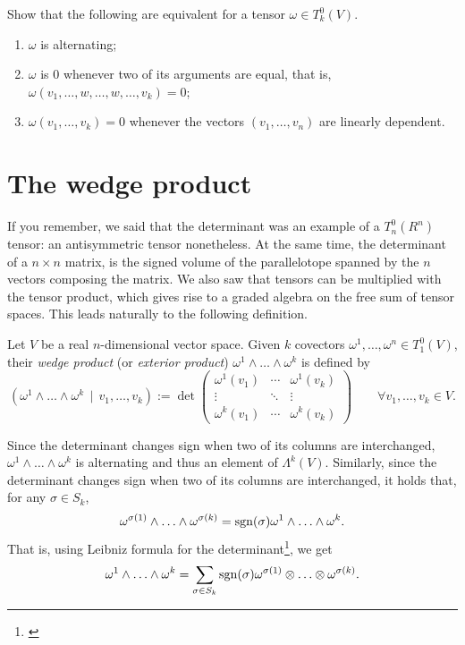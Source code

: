 \begin{exercise}\label{ex:propAlt}
  Show that the following are equivalent for a tensor $\omega\in T_k^0(V)$.
  \begin{enumerate}
    \item $\omega$ is alternating;
    \item $\omega$ is $0$ whenever two of its arguments are equal, that is, ${\omega(v_1, \ldots, w, \ldots, w, \ldots, v_k) = 0}$;
    \item $\omega(v_1, \ldots, v_k) = 0$ whenever the vectors $(v_1, \ldots, v_n)$ are linearly dependent.
  \end{enumerate}
\end{exercise}

\section{The wedge product}

If you remember, we said that the determinant was an example of a $T_n^0(R^n)$ tensor: an antisymmetric tensor nonetheless.
At the same time, the determinant of a $n\times n$ matrix, is the signed volume of the parallelotope spanned by the $n$ vectors composing the matrix.
We also saw that tensors can be multiplied with the tensor product, which gives rise to a graded algebra on the free sum of tensor spaces.
This leads naturally to the following definition.

\begin{definition}
  Let $V$ be a real $n$-dimensional vector space.
  Given $k$ covectors $\omega^1, \ldots, \omega^n\in T_1^0(V)$, their \emph{wedge product} (or \emph{exterior product}) $\omega^1\wedge\ldots\wedge\omega^k$ is defined by
  \begin{equation}
    \left(
      \omega^1\wedge\ldots\wedge\omega^k\,\mid\, v_1,\ldots,v_k
    \right) := \det\begin{pmatrix}
      \omega^1(v_1) & \cdots & \omega^1(v_k) \\
      \vdots & \ddots & \vdots \\
      \omega^k(v_1) & \cdots & \omega^k(v_k)
    \end{pmatrix} \qquad
    \forall v_1,\ldots,v_k\in V.
  \end{equation}
\end{definition}

Since the determinant changes sign when two of its columns are interchanged, $\omega^1\wedge\ldots\wedge\omega^k$ is alternating and thus an element of $\Lambda^k(V)$.
Similarly, since the determinant changes sign when two of its columns are interchanged, it holds that, for any $\sigma\in S_k$,
\begin{equation}\label{equiv:permut}
  \omega^{\sigma(1)}\wedge\ldots\wedge\omega^{\sigma(k)} = \operatorname{sgn}(\sigma) \omega^1\wedge\ldots\wedge\omega^k.
\end{equation}
That is, using Leibniz formula for the determinant\footnote{\cite[Equation (B.3)]{book:lee}}, we get
\begin{equation}\label{eq:detLeibniz}
  \omega^1\wedge\ldots\wedge\omega^k = \sum_{\sigma\in S_k}\operatorname{sgn}(\sigma) \omega^{\sigma(1)}\otimes\ldots\otimes\omega^{\sigma(k)}.
\end{equation}

